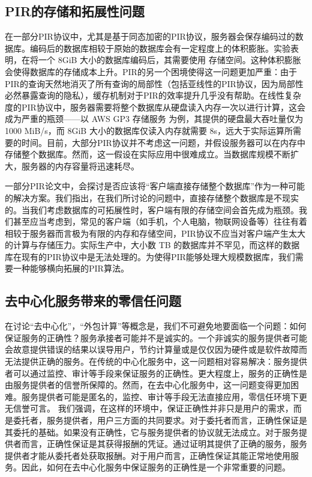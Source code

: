 \subsection{PIR的存储和拓展性问题}
在一部分PIR协议中，尤其是基于同态加密的PIR协议，服务器会保存编码过的数据库。编码后的数据库相较于原始的数据库会有一定程度上的体积膨胀。实验表明，在将一个 8GiB 大小的数据库编码后，其需要使用  存储空间。这种体积膨胀会使得数据库的存储成本上升。PIR的另一个困境使得这一问题更加严重：由于PIR的查询天然地消灭了所有查询的局部性（包括亚线性的PIR协议，因为局部性必然暴露查询的隐私），缓存机制对于PIR的效率提升几乎没有帮助。在线性复杂度的PIR协议中，服务器需要将整个数据库从硬盘读入内存一次以进行计算，这会成为严重的瓶颈——以 AWS GP3 存储服务 \cite{AWSEBSGP} 为例，其提供的硬盘最大吞吐量仅为 1000 MiB/s，而 8GiB 大小的数据库仅读入内存就需要 8s，远大于实际运算所需要的时间。目前，大部分PIR协议并不考虑这一问题，并假设服务器可以在内存中存储整个数据库。然而，这一假设在实际应用中很难成立。当数据库规模不断扩大，服务器的内存容量将迅速耗尽。

一部分PIR论文中，会探讨是否应该将“客户端直接存储整个数据库”作为一种可能的解决方案。我们指出，在我们所讨论的问题中，直接存储整个数据库是不现实的。当我们考虑数据库的可拓展性时，客户端有限的存储空间会首先成为瓶颈。我们甚至应当考虑到，常见的客户端（如手机，个人电脑，物联网设备等）往往有着相较于服务器而言极为有限的内存和存储空间，PIR协议不应当对客户端产生太大的计算与存储压力。实际生产中，大小数 TB 的数据库并不罕见，而这样的数据库在现有的PIR协议中是无法处理的。为使得PIR能够处理大规模数据库，我们需要一种能够横向拓展的PIR算法。

\subsection{去中心化服务带来的零信任问题}
在讨论“去中心化”，“外包计算”等概念是，我们不可避免地要面临一个问题：如何保证服务的正确性？服务承接者可能并不是诚实的。一个非诚实的服务提供者可能会故意提供错误的结果以误导用户，节约计算量或是仅仅因为硬件或是软件故障而无法提供正确的服务。在传统的中心化服务中，这一问题相对容易解决：服务提供者可以通过监控、审计等手段来保证服务的正确性。更大程度上，服务的正确性是由服务提供者的信誉所保障的。然而，在去中心化服务中，这一问题变得更加困难。服务提供者可能是匿名的，监控、审计等手段无法直接应用，零信任环境下更无信誉可言。
我们强调，在这样的环境中，保证正确性并非只是用户的需求，而是委托者，服务提供者，用户三方面的共同要求。对于委托者而言，正确性保证是其委托的基础。如果没有正确性，它与服务提供者的协议就无法成立。对于服务提供者而言，正确性保证是其获得报酬的凭证。通过证明其提供了正确的服务，服务提供者才能从委托者处获取报酬。对于用户而言，正确性保证其能正常地使用服务。因此，如何在去中心化服务中保证服务的正确性是一个非常重要的问题。

